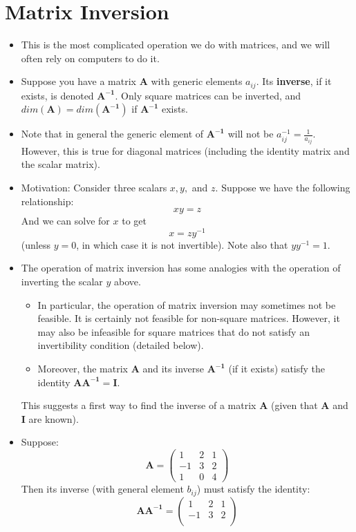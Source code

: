 \documentclass[11pt]{article}
\theoremstyle{definition}
\theoremstyle{remark}
\begin{document}
\section{Matrix Inversion}
\begin{itemize}
\item This is the most complicated operation we do with matrices, and we will often rely on computers to do it.
\item Suppose you have a matrix \textbf{A} with generic elements $a_{ij}$. Its \textbf{inverse}, if it exists, is denoted $\mathbf{A^{-1}}$. Only square matrices can be inverted, and $dim(\mathbf{A}) = dim(\mathbf{A^{-1}})$ if $\mathbf{A^{-1}}$ exists.
\item Note that in general the generic element of $\mathbf{A^{-1}}$ will not be $a_{ij}^{-1} = \frac{1}{a_{ij}}$. However, this is true for diagonal matrices (including the identity matrix and the scalar matrix).
\item Motivation: Consider three scalars $x, y,$ and $z$. Suppose we have the following relationship:
$$
xy = z
$$
And we can solve for $x$ to get
$$
x = zy^{-1}
$$
(unless $y = 0$, in which case it is not invertible). Note also that $yy^{-1} = 1$.
\item The operation of matrix inversion has some analogies with the operation of inverting the scalar $y$ above. 
\begin{itemize}
\item In particular, the operation of matrix inversion may sometimes not be feasible. It is certainly not feasible for non-square matrices. However, it may also be infeasible for square matrices that do not satisfy an invertibility condition (detailed below).
\item Moreover, the matrix \textbf{A} and its inverse $\mathbf{A^{-1}}$ (if it exists) satisfy the identity $\mathbf{AA^{-1}=I}$. 
\end{itemize}
This suggests a first way to find the inverse of a matrix $\mathbf{A}$ (given that \textbf{A} and \textbf{I} are known). 
\item Suppose:
$$
\mathbf{A} =
\begin{pmatrix}
1&2&1 \\
-1&3&2 \\
1&0&4 
\end{pmatrix}
$$
Then its inverse (with general element $b_{ij}$) must satisfy the identity:
$$
\mathbf{AA^{-1}} =
\begin{pmatrix}
1&2&1 \\
-1&3&2 \\

\end{pmatrix}$$
\end{itemize}
\end{document}
